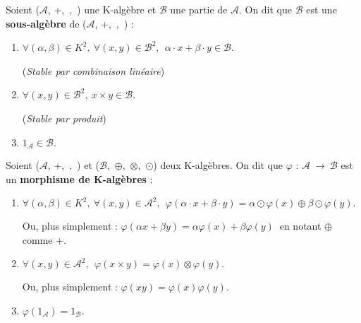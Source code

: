 \vspace{1.2cm}

Soient (\(\mathcal{A}\), +,\ \x,\ \lce) une K-algèbre et \(\mathcal{B}\) une partie de \(\mathcal{A}\). On dit que \(\mathcal{B}\) est une \textbf{sous-algèbre} de (\(\mathcal{A}\), +,\ \x,\ \lce) \ssi :\vspace{0.2cm}
\begin{enumerate}[leftmargin=2cm]
    \item \(\forall (\alpha,\beta)\in K^2,\ \forall (x,y)\in \mathcal{B}^2,\ \ \alpha\cdot x+\beta \cdot y \in \mathcal{B} \). \
    \begin{small}
        (\emph{Stable par combinaison linéaire})
    \end{small}\vspace{0.2cm}

    \item \(\forall (x,y)\in \mathcal{B}^2,\ x\times y\in \mathcal{B} \). \hspace{3.9cm}
    \begin{small}
        (\emph{Stable par produit})
    \end{small}\vspace{0.2cm}

    \item \(1_{\mathcal{A}}\in \mathcal{B}. \)
\end{enumerate}

\vspace{1.3cm}

Soient (\(\mathcal{A}\), +,\ \x,\ \lce) et (\(\mathcal{B}\),\ \(\oplus\),\ \(\otimes\),\ $\odot$) deux K-algèbres. On dit que \(\varphi\) : \(\mathcal{A}\ \to \ \mathcal{B}\) est un \textbf{morphisme de K-algèbres} \ssi :\vspace{0.1cm}
\begin{enumerate}[leftmargin=2cm]
    \item \(\forall(\alpha,\beta)\in K^2,\ \forall(x,y)\in \mathcal{A}^2,\ \ \varphi (\alpha \cdot x + \beta \cdot y)=\alpha \odot \varphi (x) \oplus \beta \odot \varphi (y). \)\vspace{0.1cm}\\
    \begin{small}
        Ou, plus simplement : \(\varphi (\alpha x + \beta y) = \alpha \varphi (x) + \beta \varphi (y) \ \) en notant \(\oplus\) comme +.
    \end{small}\vspace{0.1cm}

    \item \(\forall (x,y)\in \mathcal{A}^2,\ \ \varphi (x\times y) = \varphi(x)\otimes \varphi(y).\)\vspace{0.1cm}\\
    \begin{small}
        Ou, plus simplement : \(\varphi(xy)=\varphi(x)\varphi(y)\).
    \end{small} \vspace{0.1cm}

    \item \(\varphi \left(1_{\mathcal{A}}\right) = 1_{\mathcal{B}}. \)
\end{enumerate}

